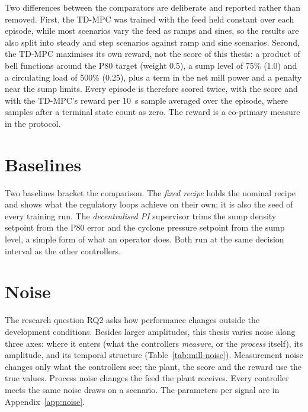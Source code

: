 Two differences between the comparators are deliberate and reported rather
than removed. First, the TD-MPC was trained with the feed held constant over
each episode, while most scenarios vary the feed as ramps and sines, so the
results are also split into steady and step scenarios against ramp and sine
scenarios. Second, the TD-MPC maximises its own reward, not the score of this
thesis: a product of bell functions around the P80 target (weight 0.5), a sump
level of 75\% (1.0) and a circulating load of 500\% (0.25), plus a term in the
net mill power and a penalty near the sump limits. Every episode is therefore
scored twice, with the score and with the TD-MPC's reward per 10~s sample
averaged over the episode, where samples after a terminal state count as zero.
The reward is a co-primary measure in the protocol.

\section{Baselines}
\label{sec:mill-baselines}
Two baselines bracket the comparison. The \emph{fixed recipe} holds the
nominal recipe and shows what the regulatory loops achieve on their own; it is
also the seed of every training run. The \emph{decentralised PI} supervisor
trims the sump density setpoint from the P80 error and the cyclone pressure
setpoint from the sump level, a simple form of what an operator does. Both run
at the same decision interval as the other controllers.

\section{Noise}
\label{sec:mill-noise}
The research question RQ2 asks how performance changes outside the development
conditions. Besides larger amplitudes, this thesis varies noise along three
axes: where it enters (what the controllers \emph{measure}, or the
\emph{process} itself), its amplitude, and its temporal structure
(Table~\ref{tab:mill-noise}). Measurement noise changes only what the
controllers see; the plant, the score and the reward use the true values.
Process noise changes the feed the plant receives. Every controller meets the
same noise draws on a scenario. The parameters per signal are in
Appendix~\ref{app:noise}.

